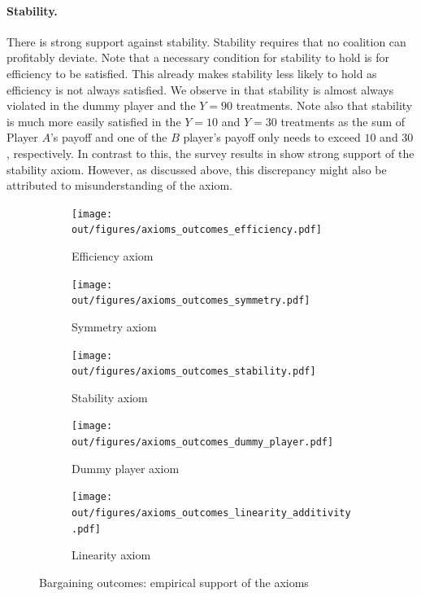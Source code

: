 \documentclass[12pt]{article}
\begin{document}
\paragraph{Stability.}
There is strong support against stability. Stability requires that no coalition can profitably deviate. Note that a necessary condition for stability to hold is for efficiency to be satisfied. This already makes stability less likely to hold as efficiency is not always satisfied. We observe in  that stability is almost always violated in the dummy player and the $Y=90$ treatments. Note also that stability is much more easily satisfied in the $Y=10$ and $Y=30$ treatments as the sum of Player $A$'s payoff and one of the $B$ player's payoff only needs to exceed $10$ and $30$, respectively.
In contrast to this, the survey results in  show strong support of the stability axiom. However, as discussed above, this discrepancy might also be attributed to misunderstanding of the axiom.

\begin{figure}
    \centering
    \begin{subfigure}[T]{0.45\textwidth}
        \centering
        \texttt{[image: out/figures/axioms\_outcomes\_efficiency.pdf]}
        \caption{Efficiency axiom}
        \label{fig:axioms_outcomes_efficiency}
    \end{subfigure}
    \hfill
    \begin{subfigure}[T]{0.45\textwidth}
        \centering
        \texttt{[image: out/figures/axioms\_outcomes\_symmetry.pdf]}
        \caption{Symmetry axiom}
        \label{fig:axioms_outcomes_symmetry}
    \end{subfigure}
    \vfill
    \begin{subfigure}[T]{0.45\textwidth}
        \centering
        \texttt{[image: out/figures/axioms\_outcomes\_stability.pdf]}
        \caption{Stability axiom}
        \label{fig:axioms_outcomes_stability}
    \end{subfigure}
    \hfill
    \begin{subfigure}[T]{0.45\textwidth}
         \centering
        \texttt{[image: out/figures/axioms\_outcomes\_dummy\_player.pdf]}
        \caption{Dummy player axiom}
        \label{fig:axioms_outcomes_dummy}
    \end{subfigure}
    \vfill
    \begin{subfigure}[b]{\textwidth}
        \centering
        \texttt{[image: out/figures/axioms\_outcomes\_linearity\_additivity.pdf]}
        \caption{Linearity axiom}
        \label{fig:axioms_outcomes_linearity}
    \end{subfigure}
    \caption{Bargaining outcomes: empirical support of the axioms}
    \label{fig:axioms_outcomes}
\end{figure}
\end{document}
